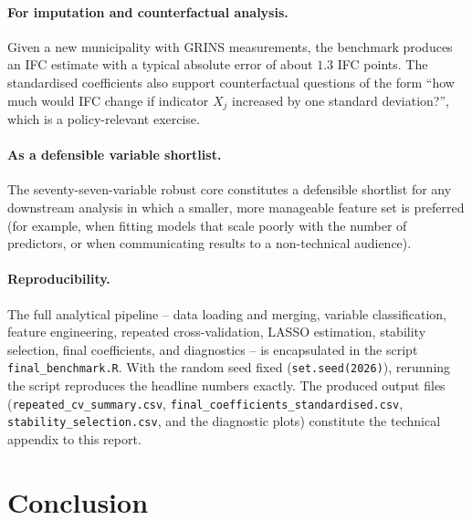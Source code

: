 \documentclass[11pt,a4paper]{article}
\begin{document}
\paragraph{For imputation and counterfactual analysis.}
Given a new municipality with GRINS measurements, the benchmark
produces an IFC estimate with a typical absolute error of about
\(1.3\) IFC points. The standardised coefficients also support
counterfactual questions of the form ``how much would IFC change if
indicator \(X_{j}\) increased by one standard deviation?'', which is a
policy-relevant exercise.

\paragraph{As a defensible variable shortlist.}
The seventy-seven-variable robust core constitutes a defensible
shortlist for any downstream analysis in which a smaller, more
manageable feature set is preferred (for example, when fitting models
that scale poorly with the number of predictors, or when communicating
results to a non-technical audience).

\paragraph{Reproducibility.}
The full analytical pipeline -- data loading and merging, variable
classification, feature engineering, repeated cross-validation,
LASSO estimation, stability selection, final coefficients, and
diagnostics -- is encapsulated in the script \texttt{final\_benchmark.R}.
With the random seed fixed (\texttt{set.seed(2026)}), rerunning the
script reproduces the headline numbers exactly. The produced output
files (\texttt{repeated\_cv\_summary.csv},
\texttt{final\_coefficients\_standardised.csv},
\texttt{stability\_selection.csv}, and the diagnostic plots)
constitute the technical appendix to this report.

\section{Conclusion}
\label{sec:conclusion}
\end{document}
